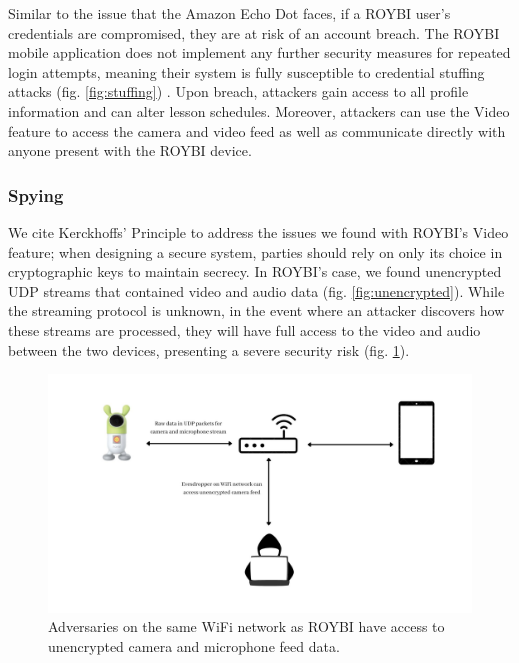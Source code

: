 \documentclass[12pt]{ucthesis}
\begin{document}
Similar to the issue that the Amazon Echo Dot faces, if a ROYBI user's credentials are compromised, they are at risk of an account breach. The ROYBI mobile application does not implement any further security measures for repeated login attempts, meaning their system is fully susceptible to credential stuffing attacks (fig. \ref{fig:stuffing}) \cite{stuffing}. Upon breach, attackers gain access to all profile information and can alter lesson schedules. Moreover, attackers can use the Video feature to access the camera and video feed as well as communicate directly with anyone present with the ROYBI device.

\subsubsection{Spying}
We cite Kerckhoffs' Principle \cite{kerckhoffs} to address the issues we found with ROYBI's Video feature; when designing a secure system, parties should rely on only its choice in cryptographic keys to maintain secrecy. In ROYBI's case, we found unencrypted UDP streams that contained video and audio data (fig. \ref{fig:unencrypted}). While the streaming protocol is unknown, in the event where an attacker discovers how these streams are processed, they will have full access to the video and audio between the two devices, presenting a severe security risk (fig. \ref{fig:evesdropper}).

\begin{figure}
    \includegraphics[width=\textwidth]{evesdropper.jpg}
    \caption{Adversaries on the same WiFi network as ROYBI have access to unencrypted camera and microphone feed data.}
    \label{fig:evesdropper}
\end{figure}
\end{document}
